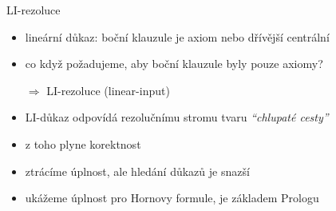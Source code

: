 \documentclass{beamer}
\begin{document}
\begin{frame}{LI-rezoluce}
    
    \begin{itemize}
        \item \alert{lineární důkaz:} boční klauzule je \alert{axiom nebo dřívější centrální}
        \item co když požadujeme, aby boční klauzule byly \alert{pouze axiomy?}
        
        $\Rightarrow$ \alert{LI-rezoluce (linear-input)}        
            
    \end{itemize}
    

    \begin{itemize}
        \item LI-důkaz odpovídá rezolučnímu stromu tvaru \emph{``chlupaté cesty''}
        \item z toho plyne korektnost
        \item ztrácíme úplnost, ale hledání důkazů je snazší
        \item ukážeme \alert{úplnost pro Hornovy formule}, je základem Prologu
    \end{itemize}

\end{frame}
\end{document}
